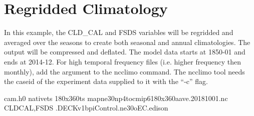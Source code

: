 \documentclass[letterpaper,10pt,english]{sphinxmanual}
\begin{document}
\section{Regridded Climatology}
\label{\detokenize{atm_regrid:regridded-climatology}}
In this example, the CLD\_CAL and FSDS variables will be regridded and averaged over the seasons to create both seasonal and annual climatologies.
The output will be compressed and deflated. The model data starts at 1850-01 and ends at 2014-12. For high temporal frequency files
(i.e. higher frequency then monthly), add the  argument to the ncclimo command. The ncclimo tool needs the caseid of the
experiment data supplied to it with the “-c” flag.

\begin{sphinxVerbatim}[commandchars=\\\{\}]

cam.h0
native\PYGZus{}ts                                    
180x360ts                                    
map\PYGZus{}ne30np4\PYGZus{}to\PYGZus{}cmip6\PYGZus{}180x360\PYGZus{}aave.20181001.nc   
CLD\PYGZus{}CAL,FSDS                                       
                                              
                                                
                                  
.DECKv1b\PYGZus{}piControl.ne30\PYGZus{}oEC.edison       


\end{sphinxVerbatim}
\end{document}
